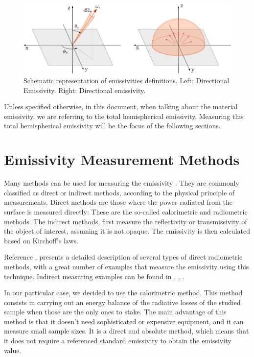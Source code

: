 \begin{figure}[h]
    \centering
    \includegraphics[width=1.0\columnwidth]{EmissivityDefinitions_Sch/EmissivityDeff.pdf}
    \caption{Schematic representation of emissivities definitions. Left: Directional Emissivity. Right: Directional emissivity.}
    \label{fig:MaxWavelenght}
\end{figure}

Unless specified otherwise, in this document, when talking about the material emissivity, we are referring to the total hemispherical emissivity. Measuring this total hemispherical emissivity will be the focus of the following sections. 

\section{Emissivity Measurement Methods}

Many methods can be used for measuring the emissivity \parencite[][]{ref:emissmeasex}. They are commonly classified as direct or indirect methods, according to the physical principle of measurements. Direct methods are those where the power radiated from the surface is measured directly: These are the so-called calorimetric and radiometric methods. 
The indirect methods, first measure the reflectivity or transmissivity of the object of interest, assuming it is not opaque. The emissivity is then calculated based on Kirchoff's laws. 

Reference \parencite[][]{ref:directMethods}, presents a detailed description of several types of direct radiometric methods, with a great number of examples that measure the emissivity using this technique. Indirect measuring examples can be found in \parencite[][]{ref:ind1}, \parencite[][]{ref:ind2}, \parencite[][]{ref:ind3}.

In our particular case, we decided to use the calorimetric method. This method consists in carrying out an energy balance of the radiative losses of the studied sample when those are the only ones to stake. The main advantage of this method is that it doesn't need sophisticated or expensive equipment, and it can measure small sample sizes. It is a direct and absolute method, which means that it does not require a referenced standard emissivity to obtain the emissivity value. 

